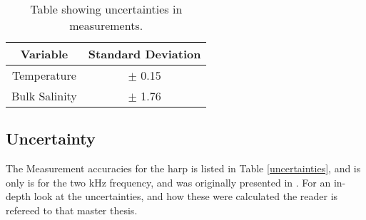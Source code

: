 \begin{table}[h!]
\centering
\begin{tabular}{c|c}
Variable      & Standard Deviation      \\ \hline
Temperature   & $\pm$ 0.15 \\
Bulk Salinity & $\pm$ 1.76
\end{tabular}
\caption{Table showing uncertainties in measurements.}
\label{uncertainties}
\end{table}

\subsection{Uncertainty}
The Measurement accuracies for the harp is listed in Table \autoref{uncertainties}, and is only is for the two kHz frequency, and was originally presented in \textcite{Fuchs}. For an in-depth look at the uncertainties, and how these were calculated the reader is refereed to that master thesis. 

